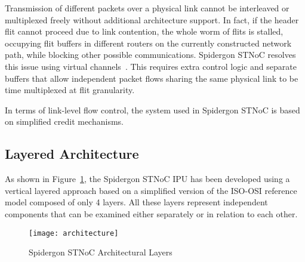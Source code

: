 Transmission of different packets over a physical link cannot be interleaved or multiplexed freely without additional architecture support. 
In fact, if the header flit cannot proceed due to link contention, the whole worm of flits is stalled, occupying flit buffers in different routers on the currently constructed network path, while blocking other possible communications. 
Spidergon STNoC resolves this issue using virtual channels~\cite{moadeli2009analytical}. 
This requires extra control logic and separate buffers that allow independent packet flows sharing the same physical link to be time multiplexed at flit granularity.

In terms of link-level flow control, the system used in Spidergon STNoC is based on simplified credit mechanisms.

\subsection{Layered Architecture}\label{S:architecture}

As shown in Figure~\ref{fig:architecture}, the Spidergon STNoC IPU has been developed using a vertical layered approach based on a simplified version of the ISO-OSI reference model composed of only 4 layers. 
All these layers represent independent components that can be examined either separately or in relation to each other.

	\begin{figure}[ht]
	\centering
		\texttt{[image: architecture]}
		\caption{Spidergon STNoC Architectural Layers}
		\label{fig:architecture}
	\end{figure}

